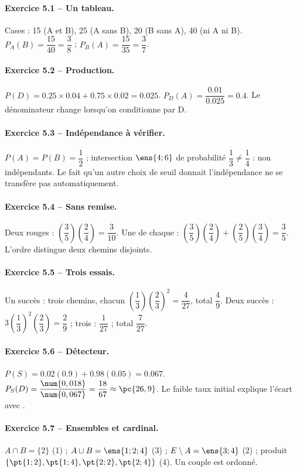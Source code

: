\paragraph{Exercice 5.1 -- Un tableau.} Cases : 15 (A et B), 25 (A sans B), 20 (B sans A), 40 (ni A ni B). $P_A(B)=\dfrac{15}{40}=\dfrac{3}{8}$ ; $P_B(A)=\dfrac{15}{35}=\dfrac{3}{7}$.
\paragraph{Exercice 5.2 -- Production.} $P(D)=\num{0,25}\times\num{0,04}+\num{0,75}\times\num{0,02}=\num{0,025}$. $P_D(A)=\dfrac{\num{0,01}}{\num{0,025}}=\num{0,4}$. Le dénominateur change lorsqu’on conditionne par D.
\paragraph{Exercice 5.3 -- Indépendance à vérifier.} $P(A)=P(B)=\dfrac{1}{2}$ ; intersection $\ens{4;6}$ de probabilité $\dfrac{1}{3}\ne \dfrac{1}{4}$ : non indépendants. Le fait qu’un autre choix de seuil donnait l’indépendance ne se transfère pas automatiquement.
\paragraph{Exercice 5.4 -- Sans remise.} Deux rouges : $(\dfrac{3}{5})(\dfrac{2}{4})=\dfrac{3}{10}$. Une de chaque : $(\dfrac{3}{5})(\dfrac{2}{4})+(\dfrac{2}{5})(\dfrac{3}{4})=\dfrac{3}{5}$. L’ordre distingue deux chemins disjoints.
\paragraph{Exercice 5.5 -- Trois essais.} Un succès : trois chemins, chacun $(\dfrac{1}{3})(\dfrac{2}{3})^2=\dfrac{4}{27}$, total $\dfrac{4}{9}$. Deux succès : $3(\dfrac{1}{3})^2(\dfrac{2}{3})=\dfrac{2}{9}$ ; trois : $\dfrac{1}{27}$ ; total $\dfrac{7}{27}$.
\paragraph{Exercice 5.6 -- Détecteur.} $P(S)=\num{0,02}(\num{0,9})+\num{0,98}(\num{0,05})=\num{0,067}$. $P_S(D)=\dfrac{\num{0,018}}{\num{0,067}}=\dfrac{18}{67}\approx \pc{26,9}$. Le faible taux initial explique l’écart avec .
\paragraph{Exercice 5.7 -- Ensembles et cardinal.} $A\cap B=\{2\}$ (1) ; $A\cup B=\ens{1;2;4}$ (3) ; $E\setminus A=\ens{3;4}$ (2) ; produit $\{\pt{1;2},\pt{1;4},\pt{2;2},\pt{2;4}\}$ (4). Un couple est ordonné.
